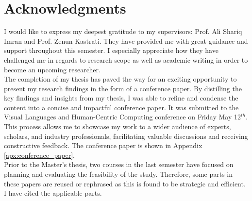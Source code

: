 \chapter*{Acknowledgments}
I would like to express my deepest gratitude to my supervisors: Prof. Ali Shariq Imran and Prof. Zenun Kastrati. They have provided me with great guidance and support throughout this semester. I especially appreciate how they have challenged me in regards to research scope as well as academic writing in order to become an upcoming researcher. \\

The completion of my thesis has paved the way for an exciting opportunity to present my research findings in the form of a conference paper. By distilling the key findings and insights from my thesis, I was able to refine and condense the content into a concise and impactful conference paper. It was submitted to the Visual Languages and Human-Centric Computing conference on Friday May 12$^{th}$. This process allows me to showcase my work to a wider audience of experts, scholars, and industry professionals, facilitating valuable discussions and receiving constructive feedback. The conference paper is shown in Appendix \ref{apx:conference_paper}. \\

Prior to the Master's thesis, two courses in the last semester have focused on planning and evaluating the feasibility of the study. Therefore, some parts in these papers are reused or rephrased as this is found to be strategic and efficient. I have cited the applicable parts. 